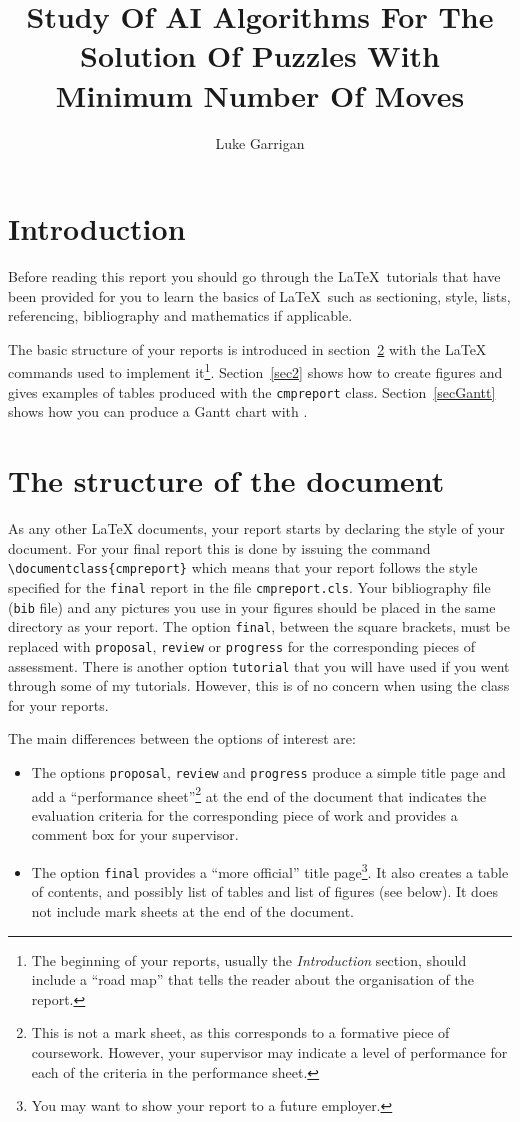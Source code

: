 \documentclass[final]{cmpreport}
\title{Study Of AI Algorithms For The Solution Of Puzzles With Minimum Number Of Moves}
\author{Luke Garrigan}
\begin{document}
\section{Introduction}




Before reading this report you should go through the \LaTeX\ tutorials that have been provided for you to learn the
basics of \LaTeX\ such as sectioning, style, lists, referencing, bibliography and mathematics if applicable.

The basic structure of your reports is introduced in section~\ref{sec1} with the \LaTeX{} commands used to implement it\footnote{The beginning of your reports, usually the \emph{Introduction} section, should include a ``road map'' that tells the reader about the organisation of the report.}. Section~\ref{sec2} shows how to create figures and gives examples of tables produced with the \verb/cmpreport/ class. Section~\ref{secGantt} shows how you can produce a Gantt chart with \LaTeXe{}. 


\section{The structure of the document} \label{sec1}

As any other \LaTeX{} documents, your report starts by declaring the style of your document. For your final report this is done by issuing the command 
\texttt{\textbackslash{}documentclass\allowbreak [final]\{cmpreport\}}
which means that your report follows the style specified for the \texttt{final} report in the file \texttt{cmpreport.cls}. Your bibliography file (\verb/bib/ file) and any pictures you use in your figures
should be placed in the same directory as your report. The option \texttt{final}, between the square brackets, must be replaced with \texttt{proposal}, \texttt{review} or \texttt{progress} for the corresponding pieces of assessment.
There is another option \texttt{tutorial} that you will have used if you went through some of my tutorials. However,
this is of no concern when using the class for your reports.

The main differences between the options of interest are:
\begin{itemize}
\item The options \texttt{proposal}, \texttt{review} and \texttt{progress} produce a simple title page and add a ``performance sheet''\footnote{This is not a mark sheet, as this corresponds to a formative piece of coursework. However, your supervisor may indicate a level of performance for each of the criteria in the performance sheet.} at the end of the document that indicates the evaluation criteria
for the corresponding piece of work and provides a comment box for your supervisor. 
\item The option \texttt{final} provides a ``more official'' title page\footnote{You may want to show your report to a future employer.\label{refnote}}. It also creates a table of contents, and possibly list of tables and list of figures (see below). It does not include mark sheets at the end of the document. 
\end{itemize}
\end{document}
